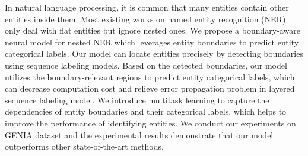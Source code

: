In natural language processing, it is common that many entities contain other entities inside them.  Most existing works on named entity recognition (NER) only deal with flat entities but ignore nested ones. We propose a boundary-aware neural model for nested NER which leverages entity boundaries to predict entity categorical labels. Our model can locate entities precisely by detecting boundaries using sequence labeling models. Based on the detected boundaries, our model utilizes the boundary-relevant regions to predict entity categorical labels, which can decrease computation cost and relieve error propagation problem in layered sequence labeling model. We introduce multitask learning to capture the dependencies of entity boundaries and their categorical labels, which helps to improve the performance of identifying entities. We conduct our experiments on GENIA dataset and the experimental results demonstrate that our model outperforms other state-of-the-art methods.